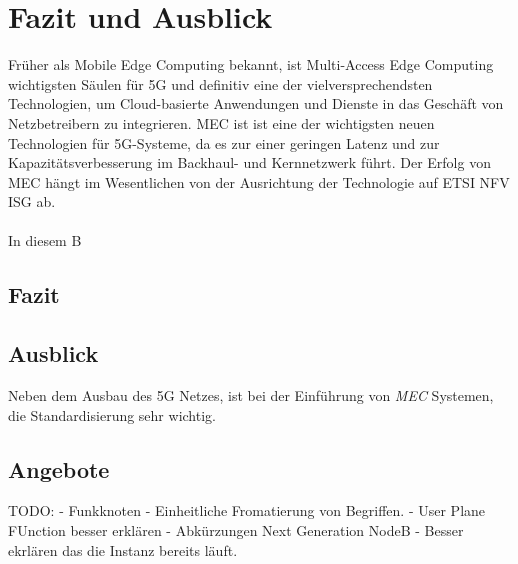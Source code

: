 \documentclass[runningheads]{llncs}
\numberwithin{figure}{section}
\begin{document}
\newpage

\section{Fazit und Ausblick}
Früher als Mobile Edge Computing bekannt, ist Multi-Access Edge Computing wichtigsten Säulen für 5G und 
definitiv eine der vielversprechendsten Technologien, 
um Cloud-basierte Anwendungen und Dienste in das Geschäft von Netzbetreibern zu integrieren.
MEC ist ist eine der wichtigsten neuen Technologien für 5G-Systeme, 
da es zur einer geringen Latenz und zur Kapazitätsverbesserung im Backhaul- und Kernnetzwerk führt. 
Der Erfolg von MEC hängt im Wesentlichen von der Ausrichtung der Technologie auf ETSI NFV ISG ab. 
\\
\\
In diesem B
\subsection{Fazit}
\subsection{Ausblick}
Neben dem Ausbau des 5G Netzes, ist bei der Einführung von \textit{MEC} Systemen, 
die Standardisierung sehr wichtig. 
\subsection{Angebote}
\label{subsec:Angebote}
\label{sec:Ausblick}


\newpage
%
\printbibliography[heading=bibintoc]
TODO: 
- Funkknoten
- Einheitliche Fromatierung von Begriffen.
- User Plane FUnction besser erklären
- Abkürzungen Next Generation NodeB 
- Besser ekrlären das die Instanz bereits läuft.
\end{document}
